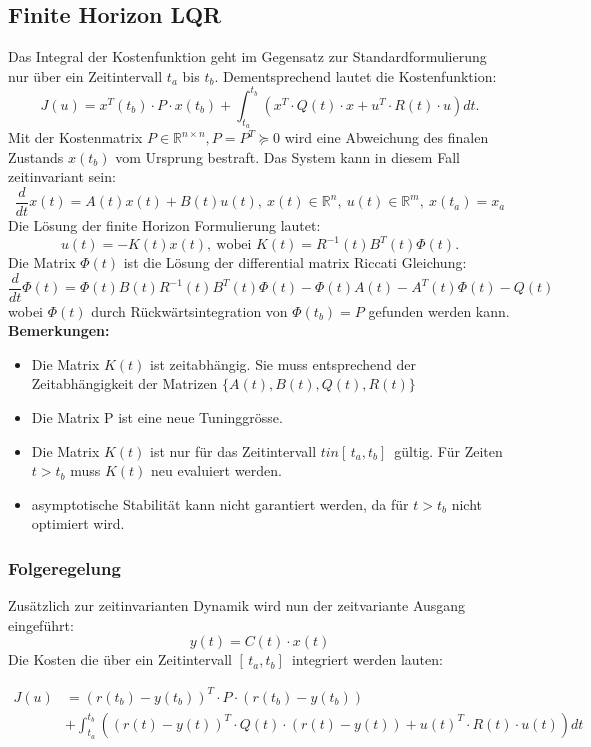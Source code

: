 \subsection{Finite Horizon LQR}
Das Integral der Kostenfunktion geht im Gegensatz zur Standardformulierung nur über ein Zeitintervall $t_a$ bis $t_b$. Dementsprechend lautet die Kostenfunktion:
\[J(u) = x^T(t_b)\cdot P \cdot x(t_b) + \int_{t_a}^{t_b}(x^T\cdot Q(t)\cdot x+u^T\cdot R(t)\cdot u) dt.\]
Mit der Kostenmatrix $ P \in \mathbb{R}^{n \times n}, P = P^T \succeq 0$ wird eine Abweichung des finalen Zustands $ x(t_b)$ vom Ursprung bestraft. Das System kann in diesem Fall zeitinvariant sein: \[\frac{d}{dt}x(t) = A(t)x(t)+B(t)u(t),\ x(t) \in \mathbb{R}^n,\ u(t) \in \mathbb{R}^m,\ x(t_a)=x_a\]
Die Lösung der finite Horizon Formulierung lautet:
\[u(t) = -K(t)x(t),\ \text{wobei } K(t)=R^{-1}(t)B^T(t)\Phi(t).\]
Die Matrix  $\Phi(t)$ ist die Lösung der differential matrix Riccati Gleichung:
\[\frac{d}{dt}\Phi(t)=\Phi(t)B(t)R^{-1}(t)B^T(t)\Phi(t) -\Phi(t)A(t)-A^T(t)\Phi(t)-Q(t)\]
wobei $\Phi(t)$ durch Rückwärtsintegration von $\Phi(t_b) = P$ gefunden werden kann.
\textbf{Bemerkungen:}
\begin{itemize}
    \item Die Matrix $K(t)$ ist zeitabhängig. Sie muss entsprechend der Zeitabhängigkeit der Matrizen $\{A(t),B(t),Q(t),R(t)\}$
    \item Die Matrix P ist eine neue Tuninggrösse.
    \item Die Matrix $K(t)$ ist nur für das Zeitintervall $ t in [\,t_a,t_b]\,$ gültig. Für Zeiten $t > t_b$ muss $K(t)$ neu evaluiert werden.
    \item asymptotische Stabilität kann nicht garantiert werden, da für $t>t_b$ nicht optimiert wird.
\end{itemize}
\subsubsection{Folgeregelung}
Zusätzlich zur zeitinvarianten Dynamik wird nun der zeitvariante Ausgang eingeführt: \[y(t) = C(t) \cdot x(t)\]
Die Kosten die über ein Zeitintervall $[\,t_a,t_b]\,$ integriert werden lauten: 

\begin{align*}J(u)&=(r(t_b)-y(t_b))^T\cdot P\cdot(r(t_b)-y(t_b))\\
&+\int_{t_a}^{t_b}((r(t)-y(t))^T \cdot Q(t)\cdot (r(t)-y(t))+u(t)^T\cdot R(t) \cdot u(t))dt
\end{align*}

